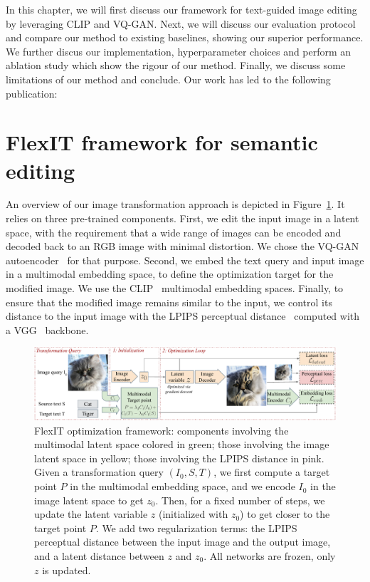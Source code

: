 In this chapter, we will first discuss our framework for text-guided image editing by leveraging \ac{CLIP} 
and VQ-GAN. Next, we will discuss our evaluation protocol and compare our method to existing baselines, 
showing our superior performance. We further discus our implementation, hyperparameter choices and perform an 
ablation study which show the rigour of our method. Finally, we discuss some limitations of our method and 
conclude. Our work has led to the following publication:



\section{FlexIT framework for semantic editing}


An overview of our image transformation approach is depicted in Figure~\ref{fig:flexit_method}. 
It relies on three pre-trained components. 
First, we edit the input image in a  latent space, with the requirement that a wide 
range of  images can be encoded and decoded back to an RGB image with minimal
 distortion. We chose the VQ-GAN autoencoder~\citep{esser2021taming} for that purpose.
Second, we embed the text query and input image in a multimodal embedding space, to 
define the optimization target for the modified image. We use the 
\ac{CLIP}~\citep{radford2021learning} multimodal embedding spaces.
Finally, to ensure that the modified image remains similar to the input, we control 
its distance to the input image with the LPIPS perceptual distance~\citep{zhanglpips2018}
 computed with a VGG~\citep{simonyan2014very} backbone.

 \begin{figure}
    \centering
    \vspace{-1em}
    \includegraphics[width=\linewidth]{images/flexit/assets/method.pdf}
    \caption{FlexIT optimization framework: components  involving the multimodal latent space  colored in green; those involving the 
    image latent space in yellow; those involving the LPIPS distance in pink. Given a transformation query $(I_0, S, T)$, we first
     compute a target point $P$ in the multimodal embedding space, and we encode $I_0$ in the image latent space to get $z_0$. Then, 
     for a fixed number of steps, we update the latent variable $z$ (initialized with $z_0$) to get closer to the target point $P$. 
    We  add two regularization terms: the LPIPS perceptual distance between the input image and the output image, and a latent distance
     between $z$ and $z_0$. All networks are frozen, only $z$ is updated.}
    \label{fig:flexit_method}
\end{figure}


